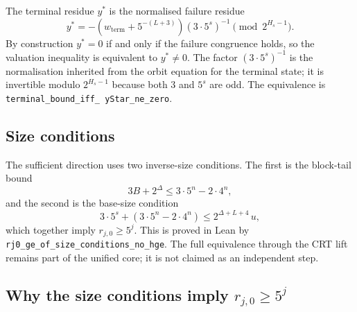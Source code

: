 The terminal residue $y^*$ is the normalised failure residue
\begin{equation*}
  y^*=
  -\left(w_{\mathrm{term}}+5^{-(L+3)}\right)
  \left(3\cdot5^s\right)^{-1}
  \pmod{2^{H_s-1}}.
\end{equation*}
By construction $y^*=0$ if and only if the failure congruence holds,
so the valuation inequality is equivalent to $y^*\ne0$.  The factor
$\left(3\cdot5^s\right)^{-1}$ is the normalisation inherited from the
orbit equation for the terminal state; it is invertible modulo
$2^{H_s-1}$ because both $3$ and $5^s$ are odd.  The equivalence is
\texttt{terminal\_\allowbreak bound\_\allowbreak iff\_\allowbreak
yStar\_\allowbreak ne\_\allowbreak zero}.

\subsection{Size conditions}

The sufficient direction uses two inverse-size conditions.  The first
is the block-tail bound
\begin{equation*}
  3B+2^\Delta\le 3\cdot5^n-2\cdot4^n,
\end{equation*}
and the second is the base-size condition
\begin{equation*}
  3\cdot5^s+\left(3\cdot5^n-2\cdot4^n\right)
    \le 2^{\Delta+L+4}\,u,
\end{equation*}
which together imply $r_{j,0}\ge5^j$.  This is proved in Lean by
\texttt{rj0\_ge\_of\_size\_conditions\_no\_hge}.  The full equivalence
through the CRT lift remains part of the unified core; it is not
claimed as an independent step.

\subsection{Why the size conditions imply $r_{j,0}\ge5^j$}

